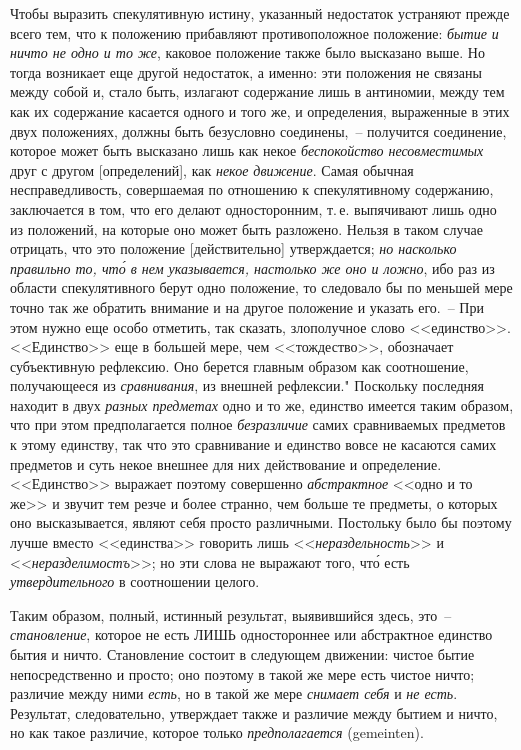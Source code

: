 Чтобы выразить спекулятивную истину, указанный недостаток
устраняют прежде всего тем, что к положению
прибавляют противоположное положение: \emph{бытие и ничто
не одно и то же}, каковое положение также было высказано
выше. Но тогда возникает еще другой недостаток, а
именно: эти положения не связаны между собой и, стало
быть, излагают содержание лишь в антиномии, между
тем как их содержание касается одного и того же, и определения,
выраженные в этих двух положениях, должны
быть безусловно соединены,~-- получится соединение, которое
может быть высказано лишь как некое \emph{беспокойство
несовместимых} друг с другом [определений], как \emph{некое
движение}. Самая обычная несправедливость, совершаемая
по отношению к спекулятивному содержанию, заключается
в том, что его делают односторонним, т.\,е. выпячивают
лишь одно из положений, на которые оно может
быть разложено. Нельзя в таком случае отрицать, что это
положение [действительно] утверждается; \emph{но насколько
правильно то, чт\'о в нем указывается, настолько же оно
и ложно}, ибо раз из области спекулятивного берут одно
положение, то следовало бы по меньшей мере точно так
же обратить внимание и на другое положение и указать
его.~-- При этом нужно еще особо отметить, так сказать,
злополучное слово <<единство>>. <<Единство>> еще в большей
мере, чем <<тождество>>, обозначает субъективную
рефлексию. Оно берется главным образом как соотношение,
получающееся из \emph{сравнивания}, из внешней рефлексии."
Поскольку последняя находит в двух \emph{разных предметах}
одно и то же, единство имеется таким образом, что
при этом предполагается полное \emph{безразличие} самих сравниваемых
предметов к этому единству, так что это сравнивание
и единство вовсе не касаются самих предметов
и суть некое внешнее для них действование и определение.
<<Единство>> выражает поэтому совершенно \emph{абстрактное}
<<одно и то же>> и звучит тем резче и более странно,
чем больше те предметы, о которых оно высказывается,
являют себя просто различными. Постольку было бы поэтому
лучше вместо <<единства>> говорить лишь <<\emph{нераздельность}>>
и <<\emph{неразделимостъ}>>; но эти слова не выражают
того, чт\'о есть \emph{утвердительного} в соотношении целого.

Таким образом, полный, истинный результат, выявившийся
здесь, это~-- \emph{становление}, которое не есть ЛИШЬ
одностороннее или абстрактное единство бытия и ничто.
Становление состоит в следующем движении: чистое бытие
непосредственно и просто; оно поэтому в такой же
мере есть чистое ничто; различие между ними \emph{есть}, но
в такой же мере \emph{снимает себя} и \emph{не есть}. Результат, следовательно,
утверждает также и различие между бытием и
ничто, но как такое различие, которое только \emph{предполагается}
(gemeinten).

